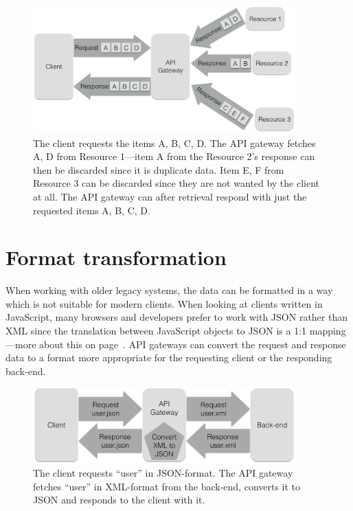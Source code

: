 \documentclass{cslthse-msc}
\begin{document}
\begin{figure}[H]
  \centering
    \begin{center}
      \includegraphics[width=0.9\textwidth]{images/api_gateway_duplicate.png}
    \end{center}
  \caption{The client requests the items A, B, C, D. The API gateway fetches A, D from Resource 1---item A from the Resource 2's response can then be discarded since it is duplicate data. Item E, F from Resource 3 can be discarded since they are not wanted by the client at all. The API gateway can after retrieval respond with just the requested items A, B, C, D.}
\end{figure}

\section{Format transformation}
When working with older legacy systems, the data can be formatted in a way which is not suitable for modern clients. When looking at clients written in JavaScript, many browsers and developers prefer to work with JSON rather than XML since the translation between JavaScript objects to JSON is a 1:1 mapping---more about this on page~\pageref{xml_json}. API gateways can convert the request and response data to a format more appropriate for the requesting client or the responding back-end.

\begin{figure}[H]
  \centering
    \begin{center}
      \includegraphics[width=0.9\textwidth]{images/api_gateway_transform.png}
    \end{center}
  \caption{The client requests \enquote{user} in JSON-format. The API gateway fetches \enquote{user} in XML-format from the back-end, converts it to JSON and responds to the client with it.}
\end{figure}
\end{document}
